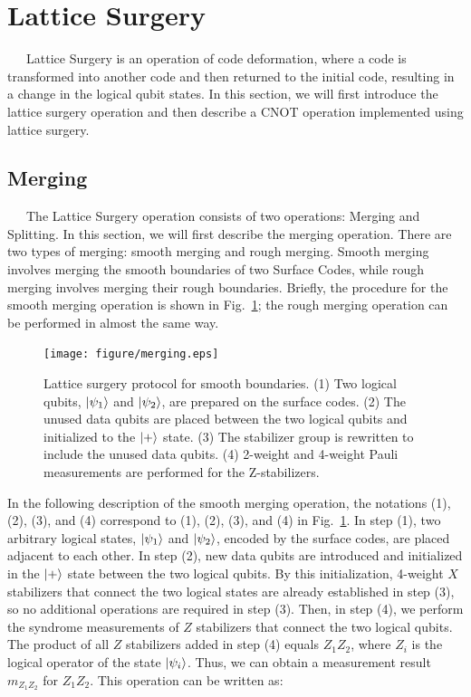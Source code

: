 \documentclass[a4paper,11pt]{ltjsarticle}
\begin{document}
\section{Lattice Surgery}\label{lattice_surgery}{
    \ \ \ Lattice Surgery \cite{horsman2012} is an operation of code deformation, where a code is transformed into another code and then returned to the initial code, resulting in a change in the logical qubit states. In this section, we will first introduce the lattice surgery operation and then describe a CNOT operation implemented using lattice surgery.

    \subsection{Merging}
    \ \ \ The Lattice Surgery operation consists of two operations: Merging and Splitting. In this section, we will first describe the merging operation. There are two types of merging: smooth merging and rough merging. Smooth merging involves merging the smooth boundaries of two Surface Codes, while rough merging involves merging their rough boundaries. Briefly, the procedure for the smooth merging operation is shown in Fig.~\ref{merging}; the rough merging operation can be performed in almost the same way.

    \begin{figure}[h]
        \centering
        \texttt{[image: figure/merging.eps]}
        \vspace{0pt}\caption{Lattice surgery protocol for smooth boundaries. (1) Two logical qubits, $\ket{\psi_1}$ and $\ket{\psi_2}$, are prepared on the surface codes. (2) The unused data qubits are placed between the two logical qubits and initialized to the $\ket{+}$ state. (3) The stabilizer group is rewritten to include the unused data qubits. (4) 2-weight and 4-weight Pauli measurements are performed for the Z-stabilizers.}
        \label{merging}
    \end{figure}

    In the following description of the smooth merging operation, the notations (1), (2), (3), and (4) correspond to (1), (2), (3), and (4) in Fig.~\ref{merging}. In step (1), two arbitrary logical states, $\ket{\psi_1}$ and $\ket{\psi_2}$, encoded by the surface codes, are placed adjacent to each other. In step (2), new data qubits are introduced and initialized in the $\ket{+}$ state between the two logical qubits. By this initialization, 4-weight $X$ stabilizers that connect the two logical states are already established in step (3), so no additional operations are required in step (3). Then, in step (4), we perform the syndrome measurements of $Z$ stabilizers that connect the two logical qubits. The product of all $Z$ stabilizers added in step (4) equals $Z_1Z_2$, where $Z_i$ is the logical operator of the state $\ket{\psi_i}$. Thus, we can obtain a measurement result $m_{Z_1Z_2}$ for $Z_1Z_2$. This operation can be written as:

}
\end{document}
